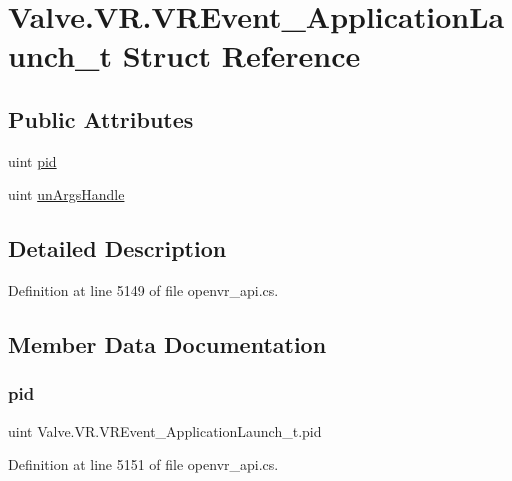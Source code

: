 \hypertarget{struct_valve_1_1_v_r_1_1_v_r_event___application_launch__t}{}\section{Valve.\+V\+R.\+V\+R\+Event\+\_\+\+Application\+Launch\+\_\+t Struct Reference}
\label{struct_valve_1_1_v_r_1_1_v_r_event___application_launch__t}
\subsection*{Public Attributes}
\begin{DoxyCompactItemize}
\item 
uint \mbox{\hyperlink{struct_valve_1_1_v_r_1_1_v_r_event___application_launch__t_a9ff226bfabda161400c432506a8a0e16}{pid}}
\item 
uint \mbox{\hyperlink{struct_valve_1_1_v_r_1_1_v_r_event___application_launch__t_a9f356dd1bf92bb685566d0e824f7daca}{un\+Args\+Handle}}
\end{DoxyCompactItemize}


\subsection{Detailed Description}


Definition at line 5149 of file openvr\+\_\+api.\+cs.



\subsection{Member Data Documentation}
\mbox{\label{struct_valve_1_1_v_r_1_1_v_r_event___application_launch__t_a9ff226bfabda161400c432506a8a0e16}} 
\subsubsection{\texorpdfstring{pid}{pid}}
{\footnotesize\ttfamily uint Valve.\+V\+R.\+V\+R\+Event\+\_\+\+Application\+Launch\+\_\+t.\+pid}



Definition at line 5151 of file openvr\+\_\+api.\+cs.

